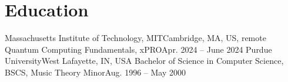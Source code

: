 \section{Education}
  \resumeSubHeadingListStart
  \resumeSubheading
      {Massachusetts Institute of Technology, MIT}{Cambridge, MA, US, remote}
      {Quantum Computing Fundamentals, xPRO}{Apr. 2024 -- June 2024}
    \resumeSubheading
      {Purdue University}{West Lafayette, IN, USA}
      {Bachelor of Science in Computer Science, BSCS, Music Theory Minor}{Aug. 1996 -- May 2000}
  \resumeSubHeadingListEnd
